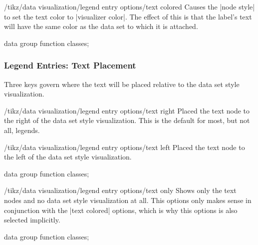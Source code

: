 \begin{key}{/tikz/data visualization/legend entry options/text colored}
  Causes the |node style| to set the text color to
  |visualizer color|. The effect of this is that the label's text
  will have the same color as the data set to which it is attached.
\begin{codeexample}[width=8cm]
\tikz \datavisualization [
  scientific axes, 
  visualize as smooth line/.list=
    {log, lin, squared, exp},
  legend={label style=text colored},
  log=    {label in legend={text=$\log x$}},
  lin=    {label in legend={text=$x/2$}},
  squared={label in legend={text=$x^2$}},
  exp=    {label in legend={text=$e^x$}},
  style sheet=strong colors]
data group {function classes};
\end{codeexample}
\end{key}


\subsubsection{Legend Entries: Text Placement}

Three keys govern where the text will be placed relative to the data
set style visualization.

\begin{key}{/tikz/data visualization/legend entry options/text right}
  Placed the text node to the right of the data set style
  visualization. This is the default for most, but not all, legends.
\end{key}
\begin{key}{/tikz/data visualization/legend entry options/text left}
  Placed the text node to the left of the data set style
  visualization. 
\begin{codeexample}[width=8cm]
\tikz \datavisualization [
  scientific axes, 
  visualize as smooth line/.list=
    {log, lin, squared, exp},
  legend={label style=text left},
  log=    {label in legend={text=$\log x$}},
  lin=    {label in legend={text=$x/2$}},
  squared={label in legend={text=$x^2$}},
  exp=    {label in legend={text=$e^x$}},
  style sheet=strong colors]
data group {function classes};
\end{codeexample}
\end{key}
\begin{key}{/tikz/data visualization/legend entry options/text only}
  Shows only the text nodes and no data set style visualization at
  all. This options only makes sense in conjunction with the
  |text colored| options, which is why this options is also selected
  implicitly. 
\begin{codeexample}[width=8cm]
\tikz \datavisualization [
  scientific axes, 
  visualize as smooth line/.list=
    {log, lin, squared, exp},
  legend={south east inside, rows=2,
          label style=text only},
  log=    {label in legend={text=$\log x$}},
  lin=    {label in legend={text=$x/2$}},
  squared={label in legend={text=$x^2$}},
  exp=    {label in legend={text=$e^x$}},
  style sheet=strong colors]
data group {function classes};
\end{codeexample}
\end{key}





